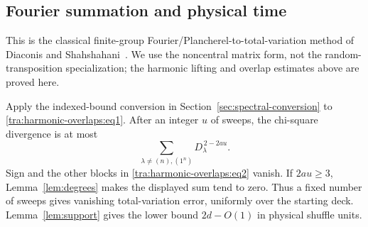 \subsection{Fourier summation and physical time}

\label{tra:harmonic-overlaps:fourier-completion}
This is the classical finite-group Fourier/Plancherel-to-total-variation
method of Diaconis and Shahshahani~\cite[Section 2, Lemma 2; Section 3,
proof of Lemma 14]{DiaconisShahshahani1981}. We use the noncentral matrix
form, not the random-transposition specialization; the harmonic lifting
and overlap estimates above are proved here.

Apply the indexed-bound conversion in
Section~\ref{sec:spectral-conversion} to
\eqref{tra:harmonic-overlaps:eq1}. After an integer $u$ of sweeps,
the chi-square divergence is at most
\begin{equation}
 \sum_{\lambda\ne(n),(1^n)}D_\lambda^{\,2-2au}.
 \label{tra:harmonic-overlaps:eq36}
\end{equation}
Sign and the other blocks in \eqref{tra:harmonic-overlaps:eq2}
vanish. If $2au\ge3$, Lemma~\ref{lem:degrees} makes the displayed
sum tend to zero. Thus a fixed number of sweeps gives vanishing
total-variation error, uniformly over the starting deck.
Lemma~\ref{lem:support} gives the lower bound $2d-O(1)$ in
physical shuffle units.
